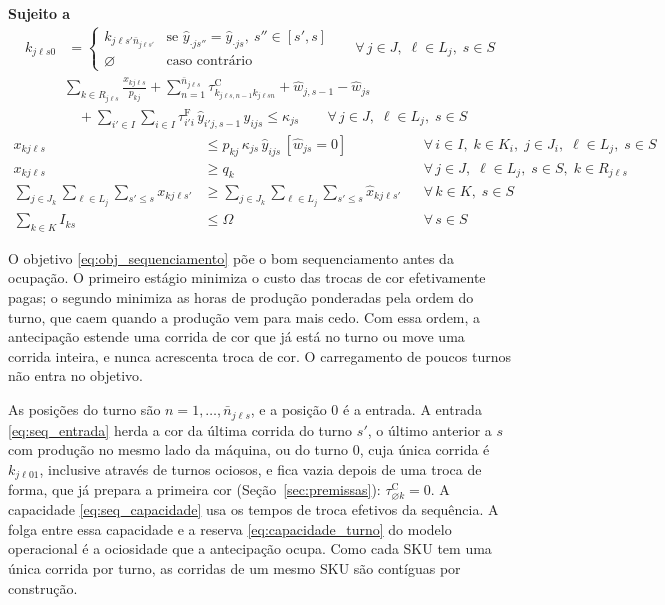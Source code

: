 \documentclass[
    12pt,
    openright,
    oneside,
    a4paper,
    fleqn,
    chapter=TITLE,
    section=TITLE,
    english,
    brazil
]{abntex2}
\begin{document}
\noindent\textbf{Sujeito a}
\begin{align}
k_{j\ell s0} &=
\begin{cases}
k_{j\ell s'\bar{n}_{j\ell s'}} & \text{se } \hat{y}_{\cdot js''} = \hat{y}_{\cdot js},\ s'' \in [s', s] \\
\varnothing & \text{caso contrário}
\end{cases}
    && \forall\, j \in J,\; \ell \in L_j,\; s \in S \label{eq:seq_entrada}
\end{align}
\begin{equation}
\begin{split}
    &\sum_{k \in R_{j\ell s}} \frac{x_{kj\ell s}}{p_{kj}} + \sum_{n=1}^{\bar{n}_{j\ell s}} \tau^{\mathrm{C}}_{k_{j\ell s,n-1}k_{j\ell sn}} + \hat{w}_{j,s-1} - \hat{w}_{js} \\
    &\quad + \sum_{i' \in I}\sum_{i \in I} \tau^{\mathrm{F}}_{i'i}\, \hat{y}_{i'j,s-1}\, \hat{y}_{ijs} \le \kappa_{js}
    \qquad \forall\, j \in J,\; \ell \in L_j,\; s \in S
\end{split}
\label{eq:seq_capacidade}
\end{equation}
\begin{align}
x_{kj\ell s} &\le p_{kj}\, \kappa_{js}\, \hat{y}_{ijs}\, [\hat{w}_{js} = 0]
    && \forall\, i \in I,\; k \in K_i,\; j \in J_i,\; \ell \in L_j,\; s \in S \label{eq:seq_forma} \\
x_{kj\ell s} &\ge q_{k}
    && \forall\, j \in J,\; \ell \in L_j,\; s \in S,\; k \in R_{j\ell s} \label{eq:seq_lote} \\
\sum_{j \in J_k}\sum_{\ell \in L_j}\sum_{s' \le s} x_{kj\ell s'} &\ge \sum_{j \in J_k}\sum_{\ell \in L_j}\sum_{s' \le s} \hat{x}_{kj\ell s'}
    && \forall\, k \in K,\; s \in S \label{eq:seq_antecipacao} \\
\sum_{k \in K} I_{ks} &\le \Omega
    && \forall\, s \in S \label{eq:seq_armazem}
\end{align}

O objetivo \eqref{eq:obj_sequenciamento} põe o bom sequenciamento antes da ocupação. O primeiro estágio minimiza o custo das trocas de cor efetivamente pagas; o segundo minimiza as horas de produção ponderadas pela ordem do turno, que caem quando a produção vem para mais cedo. Com essa ordem, a antecipação estende uma corrida de cor que já está no turno ou move uma corrida inteira, e nunca acrescenta troca de cor. O carregamento de poucos turnos não entra no objetivo.

As posições do turno são $n = 1, \dots, \bar{n}_{j\ell s}$, e a posição 0 é a entrada. A entrada \eqref{eq:seq_entrada} herda a cor da última corrida do turno $s'$, o último anterior a $s$ com produção no mesmo lado da máquina, ou do turno 0, cuja única corrida é $k_{j\ell 01}$, inclusive através de turnos ociosos, e fica vazia depois de uma troca de forma, que já prepara a primeira cor (Seção~\ref{sec:premissas}): $\tau^{\mathrm{C}}_{\varnothing k} = 0$. A capacidade \eqref{eq:seq_capacidade} usa os tempos de troca efetivos da sequência. A folga entre essa capacidade e a reserva \eqref{eq:capacidade_turno} do modelo operacional é a ociosidade que a antecipação ocupa. Como cada SKU tem uma única corrida por turno, as corridas de um mesmo SKU são contíguas por construção.
\end{document}
